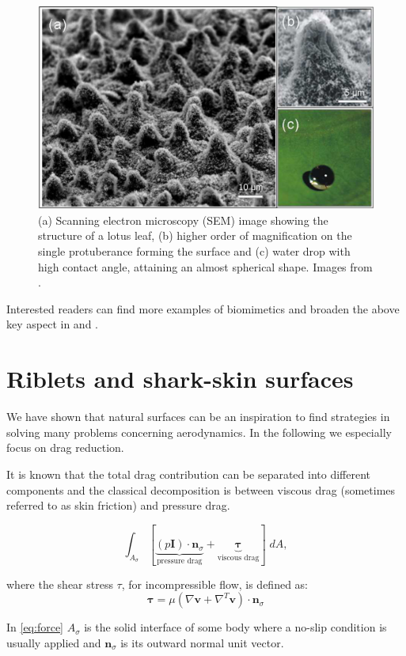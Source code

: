 \begin{figure}[t]
	\centering
	\includegraphics[width=0.6\linewidth]{chapter_1/lotus}
	\caption{(a) Scanning electron microscopy (SEM) image showing the structure of a lotus leaf, (b) higher order of magnification on the single protuberance forming the surface and (c) water drop with high contact angle, attaining an almost spherical shape. Images from \citet{stratakis2009laser}.}
	\label{fig:lotus}
\end{figure}

Interested readers can find more examples of biomimetics and broaden the above key aspect in \citet{bhushan2016biomimetics} and \citet{tropea2012nature}.

\section{Riblets and shark-skin surfaces}
We have shown that natural surfaces can be an inspiration to find strategies in solving many problems concerning aerodynamics. In the following we especially focus on drag reduction.

It is known that the total drag contribution can be separated into different components and the classical decomposition is between viscous drag (sometimes referred to as skin friction) and pressure drag.

\begin{equation}
 \int_{A_{\sigma}}  [ \underbrace{\left({p} \mathbf{I} \right) \cdot  \mathbf{n}_{\sigma} }_\text{pressure drag}  +  \underbrace{\boldsymbol{\tau}}_\text{viscous drag} ] \; dA,
 \label{eq:force}
\end{equation}

\noindent where the shear stress $\tau$, for incompressible flow, is defined as:
$$
\boldsymbol{\tau} = \mu \left( \nabla \mathbf{v} +  \nabla^T \mathbf{v} \right) \cdot  \mathbf{n}_{\sigma}
$$

\noindent In \eqref{eq:force} $A_{\sigma}$ is the solid interface of some body where a no-slip condition is usually applied and $ \mathbf{n}_{\sigma}$ is its outward normal unit vector.

